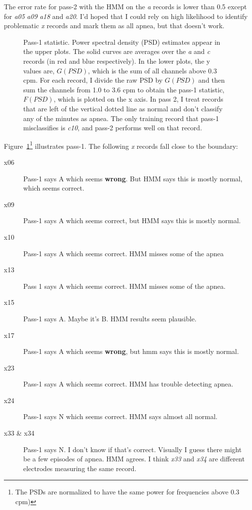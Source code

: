 \documentclass[12pt]{article}
\begin{document}
The error rate for pass-2 with the HMM on the \emph{a} records is
lower than 0.5 except for \emph{a05} \emph{a09} \emph{a18} and
\emph{a20}.  I'd hoped that I could rely on high likelihood to
identify problematic \emph{x} records and mark them as all apnea, but
that doesn't work.

\begin{figure}
  \centering
    \caption{Pass-1 statistic.  Power spectral density (PSD) estimates
      appear in the upper plots.  The solid curves are averages over
      the \emph{a} and \emph{c} records (in red and blue
      respectively).  In the lower plots, the y values are, $G(PSD)$,
      which is the sum of all channels above 0.3 cpm.  For each
      record, I divide the raw PSD by $G(PSD)$ and then sum the
      channels from 1.0 to 3.6 cpm to obtain the pass-1 statistic,
      $F(PSD)$, which is plotted on the x axis.  In pass 2, I treat
      records that are left of the vertical dotted line as normal and
      don't classify any of the minutes as apnea.  The only training
      record that pass-1 misclassifies is \emph{c10}, and pass-2
      performs well on that record.}
  \label{fig:statistics}
\end{figure}

Figure~\ref{fig:statistics}\footnote{The PSDs are normalized to have
  the same power for frequencies above 0.3 cpm)} illustrates pass-1.
  The following \emph{x} records fall close to the boundary:
\begin{description}
\item[x06] Pass-1 says A which seems \textbf{wrong}.  But HMM says this
  is mostly normal, which seems correct.
\item[x09] Pass-1 says A which seems correct, but HMM says this is
  mostly normal.
\item[x10] Pass-1 says A which seems correct.  HMM misses some of the
  apnea
\item[x13] Pass 1 says A which seems correct.  HMM misses some of the
  apnea.
\item[x15] Pass-1 says A.  Maybe it's B.  HMM results seem plausible.
\item[x17] Pass-1 says A which seems \textbf{wrong}, but hmm says this
  is mostly normal.
\item[x23] Pass-1 says A which seems correct.  HMM has trouble
  detecting apnea.
\item[x24] Pass-1 says N which seems correct.  HMM says almost all
  normal.
\item[x33 \& x34] Pass-1 says N.  I don't know if that's correct.
  Visually I guess there might be a few episodes of apnea.  HMM
  agrees.  I think \emph{x33} and \emph{x34} are different electrodes
  measuring the same record.
\end{description}
\end{document}
